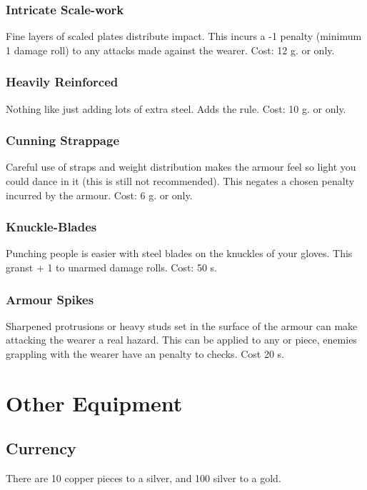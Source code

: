 \subsection{Intricate Scale-work}
Fine layers of scaled plates distribute impact. This incurs a -1  penalty (minimum 1 damage roll) to any attacks made against the wearer. Cost: 12 g.  or  only.

\subsection{Heavily Reinforced}
Nothing like just adding lots of extra steel. Adds the  rule. Cost: 10 g.  or  only.

\subsection{Cunning Strappage}
Careful use of straps and weight distribution makes the armour feel so light you could dance in it (this is still not recommended). This negates a chosen  penalty incurred by the armour. Cost: 6 g.  or  only.

\subsection{Knuckle-Blades}
Punching people is easier with steel blades on the knuckles of your gloves. This granst + 1  to unarmed damage rolls. Cost: 50 s.

\subsection{Armour Spikes}
Sharpened protrusions or heavy studs set in the surface of the armour can make attacking the wearer a real hazard. This can be applied to any  or  piece, enemies grappling with the wearer have an  penalty to  checks. Cost 20 s.



\chapter{Other Equipment}

\section{Currency}
There are 10 copper pieces to a silver, and 100 silver to a gold.

